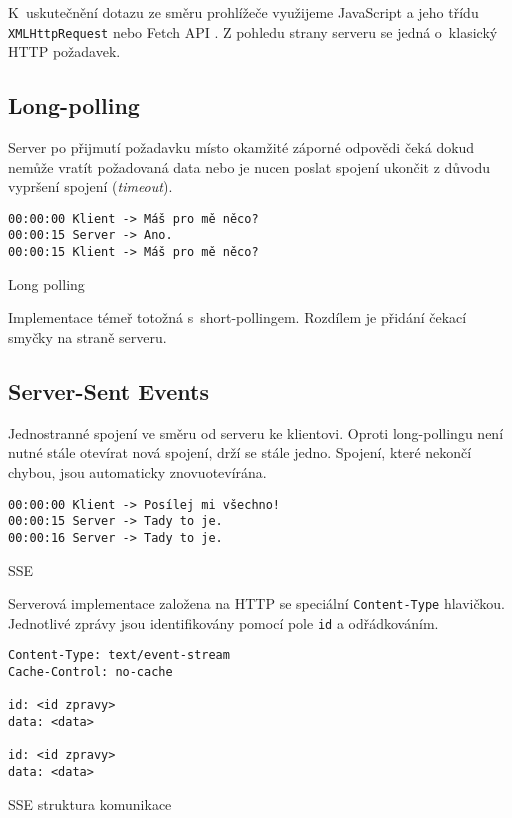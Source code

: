 K~uskutečnění dotazu ze směru prohlížeče využijeme JavaScript a jeho třídu \verb|XMLHttpRequest| nebo Fetch API \cite{fetch_api}.
Z pohledu strany serveru se jedná o~klasický HTTP požadavek.

\subsection{Long-polling}

Server po přijmutí požadavku místo okamžité záporné odpovědi čeká dokud nemůže vratít požadovaná data nebo je nucen poslat spojení ukončit z důvodu vypršení spojení (\textit{timeout}).

\begin{listing}[ht]
\begin{verbatim}
00:00:00 Klient -> Máš pro mě něco?
00:00:15 Server -> Ano.
00:00:15 Klient -> Máš pro mě něco?
\end{verbatim}
\caption{Long polling}
\end{listing}

Implementace témeř totožná s~short-pollingem.
Rozdílem je přidání čekací smyčky na straně serveru.

\subsection{Server-Sent Events}

Jednostranné spojení ve směru od serveru ke klientovi.
Oproti long-pollingu není nutné stále otevírat nová spojení, drží se stále jedno.
Spojení, které nekončí chybou, jsou automaticky znovuotevírána.

\begin{listing}[ht]
\begin{verbatim}
00:00:00 Klient -> Posílej mi všechno!
00:00:15 Server -> Tady to je.
00:00:16 Server -> Tady to je.
\end{verbatim}
\caption{SSE}
\end{listing}

\noindent
Serverová implementace založena na HTTP se speciální \verb|Content-Type| hlavičkou.
Jednotlivé zprávy jsou identifikovány pomocí pole \verb|id| a odřádkováním.
\cite{sse}

\begin{listing}[ht]
\begin{verbatim}
Content-Type: text/event-stream
Cache-Control: no-cache

id: <id zpravy>
data: <data>

id: <id zpravy>
data: <data>
\end{verbatim}
\caption{SSE struktura komunikace}
\end{listing}

